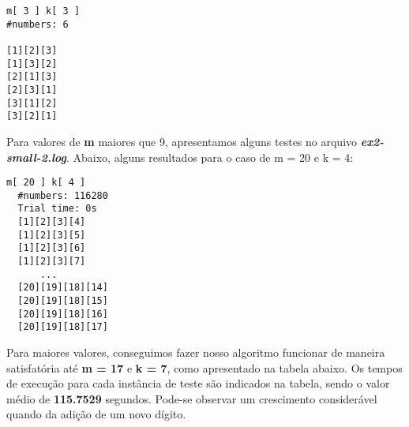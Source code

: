 \documentclass[twoside]{article}
\begin{document}
\begin{multicols}{2}
\begin{lstlisting}
m[ 3 ] k[ 3 ]
#numbers: 6

[1][2][3]
[1][3][2]
[2][1][3]
[2][3][1]
[3][1][2]
[3][2][1]

\end{lstlisting}

\indent Para valores de \textbf{m} maiores que 9, apresentamos alguns testes no arquivo \textbf{\textit{ex2-small-2.log}}. Abaixo, alguns resultados para o caso de m = 20 e k = 4:

\begin{lstlisting}
m[ 20 ] k[ 4 ]
  #numbers: 116280
  Trial time: 0s
  [1][2][3][4]
  [1][2][3][5]
  [1][2][3][6]
  [1][2][3][7]
      ...
  [20][19][18][14]
  [20][19][18][15]
  [20][19][18][16]
  [20][19][18][17]
\end{lstlisting}

\indent Para maiores valores, conseguimos fazer nosso algoritmo funcionar de maneira satisfatória até \textbf{m = 17} e \textbf{k = 7}, como apresentado na tabela abaixo. Os tempos de execução para cada instância de teste são indicados na tabela, sendo o valor médio de \textbf{115.7529} segundos. Pode-se observar um crescimento considerável quando da adição de um novo dígito.\\


\end{multicols}
\end{document}
